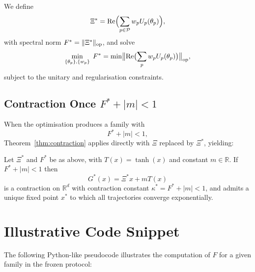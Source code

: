 \documentclass[11pt,letterpaper]{article}
\begin{document}
We define
\begin{equation}
  \Xi^* = \operatorname{Re}\Bigl(\sum_{p\in\mathcal{P}} w_p U_p(\theta_p)\Bigr),
\end{equation}
with spectral norm \(F^* = \|\Xi^*\|_{\rm op}\), and solve
\begin{equation}
  \min_{\{\theta_p\},\{w_p\}} \; F^* 
  = \min \bigl\|\operatorname{Re}\bigl(\sum_p w_p U_p(\theta_p)\bigr)\bigr\|_{\rm op},
\end{equation}
subject to the unitary and regularisation constraints.

\subsection{Contraction Once \(F^* + |m| < 1\)}

When the optimisation produces a family with
\begin{equation}
  F^* + |m| < 1,
\end{equation}
Theorem~\ref{thm:contraction} applies directly with \(\Xi\) replaced by
\(\Xi^*\), yielding:

\begin{corollary}
Let \(\Xi^*\) and \(F^*\) be as above, with \(T(x)=\tanh(x)\)
and constant \(m\in\mathbb{R}\). If \(F^* + |m| < 1\) then
\[
  G^*(x) = \Xi^* x + m T(x)
\]
 is a contraction on \(\mathbb{R}^d\) with contraction constant
\(\kappa^* = F^* + |m| < 1\), and admits a unique fixed point
\(x^*\) to which all trajectories converge exponentially.
\end{corollary}

\section{Illustrative Code Snippet}

The following Python-like pseudocode illustrates the computation of \(F\)
for a given family in the frozen protocol:
\end{document}
